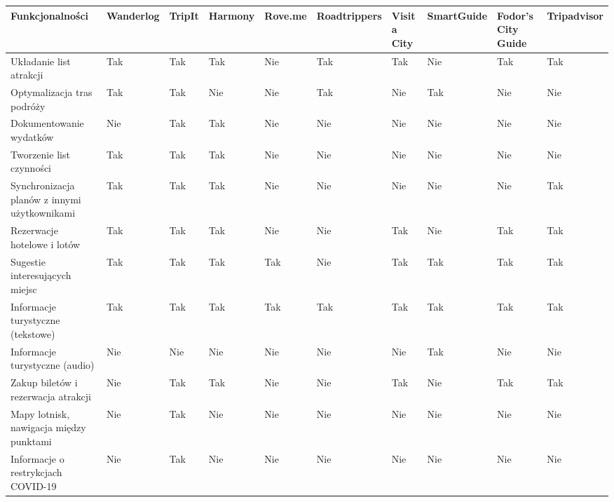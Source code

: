 \begin{landscape}

    \begin{longtable}{|>{\raggedright\arraybackslash}p{5cm}|>{\centering\arraybackslash}p{1.5cm}|>{\centering\arraybackslash}p{1.5cm}|>{\centering\arraybackslash}p{1.5cm}|>{\centering\arraybackslash}p{1.5cm}|>{\centering\arraybackslash}p{1.5cm}|>{\centering\arraybackslash}p{1.5cm}|>{\centering\arraybackslash}p{1.5cm}|>{\centering\arraybackslash}p{1.5cm}|>{\centering\arraybackslash}p{1.5cm}|}
        \hline
        \textbf{Funkcjonalności} & \textbf{Wanderlog} & \textbf{TripIt} & \textbf{Harmony} & \textbf{Rove.me} & \textbf{Roadtrippers} & \textbf{Visit a City} & \textbf{SmartGuide} & \textbf{Fodor’s City Guide} & \textbf{Tripadvisor} \\
        \hline
        Układanie list atrakcji & Tak & Tak & Tak & Nie & Tak & Tak & Nie & Tak & Tak \\
        \hline
        Optymalizacja tras podróży & Tak & Tak & Nie & Nie & Tak & Nie & Tak & Nie & Nie \\
        \hline
        Dokumentowanie wydatków & Nie & Tak & Tak & Nie & Nie & Nie & Nie & Nie & Nie \\
        \hline
        Tworzenie list czynności & Tak & Tak & Tak & Nie & Nie & Nie & Nie & Nie & Nie \\
        \hline
        Synchronizacja planów z innymi użytkownikami & Tak & Tak & Tak & Nie & Nie & Nie & Nie & Nie & Tak \\
        \hline
        Rezerwacje hotelowe i lotów & Tak & Tak & Tak & Nie & Nie & Tak & Nie & Tak & Tak \\
        \hline
        Sugestie interesujących miejsc & Tak & Tak & Tak & Tak & Nie & Tak & Tak & Tak & Tak \\
        \hline
        Informacje turystyczne (tekstowe) & Tak & Tak & Tak & Tak & Tak & Tak & Tak & Tak & Tak \\
        \hline
        Informacje turystyczne (audio) & Nie & Nie & Nie & Nie & Nie & Nie & Tak & Nie & Nie \\
        \hline
        Zakup biletów i rezerwacja atrakcji & Nie & Tak & Tak & Nie & Nie & Tak & Nie & Tak & Tak \\
        \hline
        Mapy lotnisk, nawigacja między punktami & Nie & Tak & Nie & Nie & Nie & Nie & Nie & Nie & Nie \\
        \hline
        Informacje o restrykcjach COVID-19 & Nie & Tak & Nie & Nie & Nie & Nie & Nie & Nie & Nie \\

\end{longtable}
\end{landscape}
